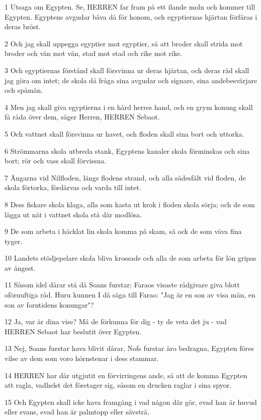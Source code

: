 \par 1 Utsaga om Egypten. Se, HERREN far fram på ett ilande moln och kommer till Egypten. Egyptens avgudar bäva då för honom, och egyptiernas hjärtan förfäras i deras bröst.
\par 2 Och jag skall uppegga egyptier mot egyptier, så att broder skall strida mot broder och vän mot vän, stad mot stad och rike mot rike.
\par 3 Och egyptiernas förstånd skall försvinna ur deras hjärtan, och deras råd skall jag göra om intet; de skola då fråga sina avgudar och signare, sina andebesvärjare och spåmän.
\par 4 Men jag skall giva egyptierna i en hård herres hand, och en grym konung skall få råda över dem, säger Herren, HERREN Sebaot.
\par 5 Och vattnet skall försvinna ur havet, och floden skall sina bort och uttorka.
\par 6 Strömmarna skola utbreda stank, Egyptens kanaler skola förminskas och sina bort; rör och vass skall förvissna.
\par 7 Ängarna vid Nilfloden, längs flodens strand, och alla sädesfält vid floden, de skola förtorka, fördärvas och varda till intet.
\par 8 Dess fiskare skola klaga, alla som kasta ut krok i floden skola sörja; och de som lägga ut nät i vattnet skola stå där modlösa.
\par 9 De som arbeta i häcklat lin skola komma på skam, så ock de som väva fina tyger.
\par 10 Landets stödjepelare skola bliva krossade och alla de som arbeta för lön gripas av ångest.
\par 11 Såsom idel dårar stå då Soans furstar; Faraos visaste rådgivare giva blott oförnuftiga råd. Huru kunnen I då säga till Farao: "Jag är en son av visa män, en son av forntidens konungar"?
\par 12 Ja, var är dina vise? Må de förkunna för dig - ty de veta det ju - vad HERREN Sebaot har beslutit över Egypten.
\par 13 Nej, Soans furstar hava blivit dårar, Nofs furstar äro bedragna, Egypten föres vilse av dem som voro hörnstenar i dess stammar.
\par 14 HERREN har där utgjutit en förvirringens ande, så att de komma Egypten att ragla, vadhelst det företager sig, såsom en drucken raglar i sina spyor.
\par 15 Och Egypten skall icke hava framgång i vad någon där gör, evad han är huvud eller svans, evad han är palmtopp eller sävstrå.
